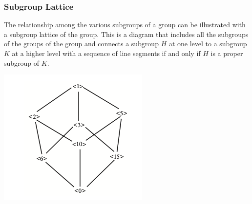 \documentclass{beamer}
\begin{document}
\begin{frame}
    \frametitle{Subgroup Lattice }

    The  relationship among the various subgroups of a group can be illustrated with a subgroup lattice of the group. This is a diagram that includes all the subgroups of the groups of the group and connects a subgroup \(H\) at one level to a subgroup \(K\) at a higher level with a sequence of line segments if and only if \(H\) is a proper subgroup of \(K\). 

    \includegraphics[scale=0.5]{Figures/fig_1.png}

\end{frame}
\end{document}
